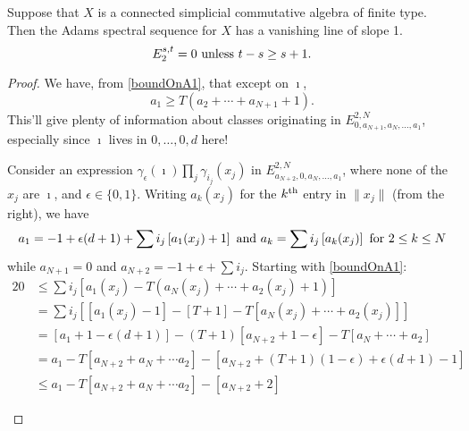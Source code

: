 \documentclass[10pt]{article}
\begin{document}
\begin{thm}
Suppose that $X$ is a connected simplicial commutative algebra of finite type. %
Then the Adams spectral sequence for $X$ has a vanishing line of slope 1.
\[E_2^{s,t}=0\textup{\ unless $t-s\geq s+1$.}\]
\end{thm}
\begin{proof}
We have, from \ref{boundOnA1}, that except on $\imath$,
\[a_1\geq T(a_2+\cdots +a_{N+1}+1).\]
This'll give plenty of information about classes originating in $E^{2,N}_{0,a_{N+1},a_N,\ldots,a_1}$, especially since $\imath$ lives in $0,\ldots,0,d$ here!

Consider an expression $\gamma_\epsilon(\imath)\prod_j\gamma_{i_j}(x_j)$ in $E^{2,N}_{a_{N+2},0,a_N,\ldots,a_1}$, where none of the $x_j$ are $\imath$, and $\epsilon\in\{0,1\}$. Writing $a_k(x_j)$ for the $k^{\textup{th}}$ entry in $\|x_j\|$ (from the right), we have
\[a_1=-1+\epsilon(d+1)+\sum i_j\left[a_1(x_j)+1\right]\textup{ and }a_k=\sum i_j\left[a_k(x_j)\right]\textup{ for $2\leq k\leq N$}\]
while $a_{N+1}=0$ and $a_{N+2}=-1+\epsilon+\sum i_j$. Starting with \ref{boundOnA1}:
\begin{alignat*}{2}
0
&\leq
\sum i_j\left[a_1(x_j)-T(a_N(x_j)+\cdots +a_2(x_j)+1)\right]%
\\
&=
\sum i_j\left[[a_1(x_j)-1]-[T+1]-T[a_N(x_j)+\cdots +a_2(x_j)]\right]%
\\
&=
[a_1+1-\epsilon(d+1)]-(T+1)[a_{N+2}+1-\epsilon]-T[a_N+\cdots +a_2]\\%
&=a_1-T\left[a_{N+2}+a_N+\cdots a_2\right]-\left[a_{N+2}+(T+1)(1-\epsilon)+\epsilon(d+1)-1\right]\\
&\leq a_1-T\left[a_{N+2}+a_N+\cdots a_2\right]-\left[a_{N+2}+2\right]
\end{alignat*}



\textup{}

\textup{}


\end{proof}
\end{document}
